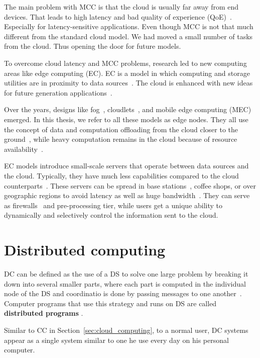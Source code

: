 The main problem with MCC is that the cloud is usually far away from end devices. That leads to high latency and bad quality of experience (QoE)~\cite{LinLJL19}. Especially for latency-sensitive applications. Even though MCC is not that much different from the standard cloud model. We had moved a small number of tasks from the cloud. Thus opening the door for future models.

To overcome cloud latency and MCC problems, research led to new computing areas like edge computing (EC). EC is a model in which computing and storage utilities are in proximity to data sources~\cite{Satyanarayanan17}. The cloud is enhanced with new ideas for future generation applications~\cite{NingLSY20}. 

Over the years, designs like fog~\cite{BonomiMNZ14}, cloudlets~\cite{MonsalveCC18}, and mobile edge computing (MEC)~\cite{WangZZWYW17} emerged. In this thesis, we refer to all these models as edge nodes. They all use the concept of data and computation offloading from the cloud closer to the ground~\cite{KhuneP19}, while heavy computation remains in the cloud because of resource availability~\cite{NingLSY20}. 

EC models introduce small-scale servers that operate between data sources and the cloud. Typically, they have much less capabilities compared to the cloud counterparts~\cite{ChenHLLW15}. These servers can be spread in base stations~\cite{WangZZWYW17}, coffee shops, or over geographic regions to avoid latency as well as huge bandwidth~\cite{MonsalveCC18}. They can serve as firewalls~\cite{SatyanarayananK19} and pre-processing tier, while users get a unique ability to dynamically and selectively control the information sent to the cloud.
%
%
\section{Distributed computing}\label{sec:distributed_computing}
%
DC can be defined as the use of a DS to solve one large problem by breaking it down into several smaller parts, where each part is computed in the individual node of the DS and coordinatio is done by passing messages to one another~\cite{0019513}. Computer programs that use this strategy and runs on DS are called \textbf{distributed programs} \cite{Vera16, andrews2000foundations}. 

Similar to CC in Section~\ref{sec:cloud_computing}, to a normal user, DC systems appear as a single system similar to one he use every day on his personal computer.

